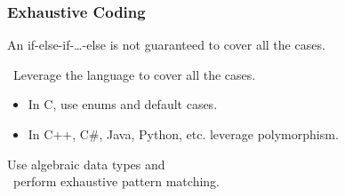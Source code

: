 \begin{frame}

\frametitle{Exhaustive Coding}

\begin{center}

An if-else-if-\ldots-else is not guaranteed to cover all the cases.

\end{center}

\vspace{\fill}

\begin{center}

\leftthumbsup~Leverage the language to cover all the cases.~\rightthumbsup

\end{center}

\vspace{\fill}

\begin{itemize}

\item In C, use enums and default cases.

\item In C++, C\#, Java, Python, etc. leverage polymorphism.

\end{itemize}

\vspace{\fill}

\pause

\begin{center}

Use algebraic data types and \\ \leftthumbsup~perform exhaustive pattern
matching.~\rightthumbsup


\end{center}

\end{frame}
